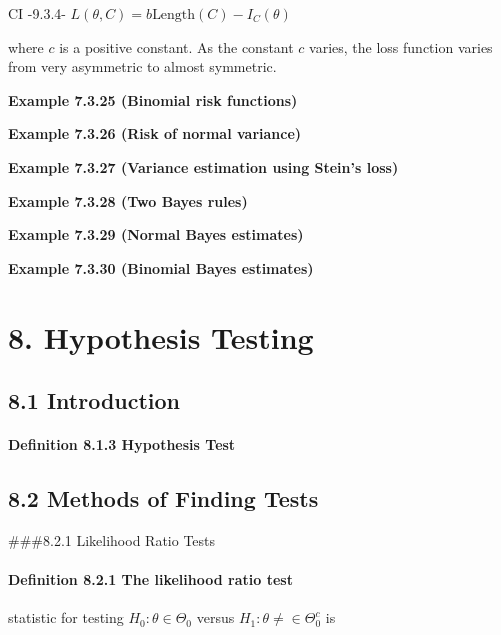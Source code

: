 \documentclass[6pt,Portrait]{article}
\let\oldparagraph\paragraph
\renewcommand{\paragraph}[1]{\oldparagraph{#1}\mbox{}}
\begin{document}
CI -9.3.4- \(L(\theta,C)=b\text{Length}(C)-I_C(\theta)\)

where \(c\) is a positive constant. As the constant \(c\) varies, the
loss function varies from very asymmetric to almost symmetric.

\textbf{Example 7.3.25 (Binomial risk functions)}

\textbf{Example 7.3.26 (Risk of normal variance)}

\textbf{Example 7.3.27 (Variance estimation using Stein's loss)}

\textbf{Example 7.3.28 (Two Bayes rules)}

\textbf{Example 7.3.29 (Normal Bayes estimates)}

\textbf{Example 7.3.30 (Binomial Bayes estimates)}

\hypertarget{hypothesis-testing}{%
\section{8. Hypothesis Testing}\label{hypothesis-testing}}

\hypertarget{introduction-1}{%
\subsection{8.1 Introduction}\label{introduction-1}}

\hypertarget{HypoT}{%
\paragraph{\texorpdfstring{\textbf{Definition 8.1.3 Hypothesis
Test}}{Definition 8.1.3 Hypothesis Test}}\label{HypoT}}

\hypertarget{methods-of-finding-tests}{%
\subsection{8.2 Methods of Finding
Tests}\label{methods-of-finding-tests}}

\#\#\#8.2.1 Likelihood Ratio Tests

\hypertarget{LRT}{%
\paragraph{\texorpdfstring{\textbf{Definition 8.2.1 The likelihood ratio
test}}{Definition 8.2.1 The likelihood ratio test}}\label{LRT}}

statistic for testing \(H_0:\theta\in\Theta_0\) versus
\(H_1:\theta\ne\in\Theta_0^c\) is
\end{document}

